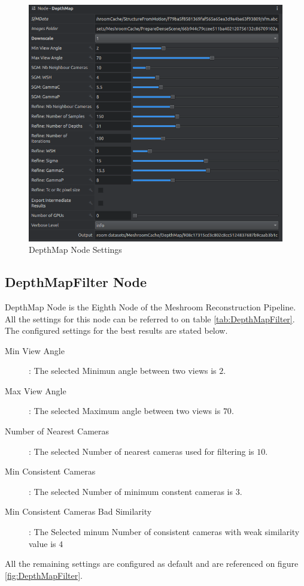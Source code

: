 \documentclass[12pt]{report}
\begin{document}
\begin{figure}[H]%
  \centering
 \includegraphics[width=1\textwidth]{DepthMapSetting.png}
\caption{DepthMap Node Settings}
\label{fig:DepthMapSetting} 
\end{figure}



\subsection*{DepthMapFilter Node}
DepthMap Node is the Eighth Node of the Meshroom Reconstruction Pipeline. All the settings for this node can be referred to on table \ref{tab:DepthMapFilter}.
The configured settings for the best results are stated below.

\begin{description}
  \item[Min View Angle]: The selected Minimun angle between two views is $2$.
  \item[Max View Angle]: The selected Maximum angle between two views is $70$.
  \item[Number of Nearest Cameras]: The selected Number of nearest cameras used for filtering is $10$.
  \item[Min Consistent Cameras]: The selected Number of minimum constent cameras is $3$.
  \item[Min Consistent Cameras Bad Similarity] : The Selected minum Number of consistent cameras with weak similarity value is $4$   
\end{description}
All the remaining settings are configured as default and are referenced on figure \ref{fig:DepthMapFilter}.
\end{document}
